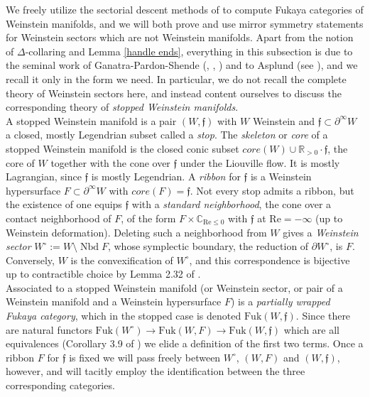 \documentclass[11pt]{amsart}
\theoremstyle{definition}
\theoremstyle{remark}
\newcommand{\Fuk}{\mathrm{Fuk}}
\numberwithin{equation}{section}
\begin{document}
We freely utilize the sectorial descent methods of \cite{GPSI} to compute Fukaya categories of Weinstein manifolds, and we will both prove and use mirror symmetry statements for Weinstein sectors which are not Weinstein manifolds. Apart from the notion of $\Delta$-collaring and Lemma \ref{handle ends}, everything in this subsection is due to the seminal work of Ganatra-Pardon-Shende (\cite{GPS1}, \cite{GPSI}, \cite{GPSIII}) and to Asplund (see \cite{Asplund}), and we recall it only in the form we need. In particular, we do not recall the complete theory of Weinstein sectors here, and instead content ourselves to discuss the corresponding theory of \textit{stopped Weinstein manifolds}.\\

A stopped Weinstein manifold is a pair $(W,\mathfrak f)$ with $W$ Weinstein and $\mathfrak f\subset\partial^\infty W$ a closed, mostly Legendrian subset called a \textit{stop}. The \textit{skeleton} or \textit{core} of a stopped Weinstein manifold is the closed conic subset $core(W)\cup\mathbb R_{>0}\cdot\mathfrak f$, the core of $W$ together with the cone over $\mathfrak f$ under the Liouville flow. It is mostly Lagrangian, since $\mathfrak f$ is mostly Legendrian. A \textit{ribbon} for $\mathfrak f$ is a Weinstein hypersurface $F\subset\partial^\infty W$ with $core(F)=\mathfrak f$. Not every stop admits a ribbon, but the existence of one equips $\mathfrak f$ with a \textit{standard neighborhood}, the cone over a contact neighborhood of $F$, of the form $F \times\mathbb C_{\mathrm{Re}\le0}$ with $\mathfrak f$ at $\mathrm{Re}= -\infty$ (up to Weinstein deformation). Deleting such a neighborhood from $W$ gives a \textit{Weinstein sector} $W^\circ:= W \setminus \operatorname{Nbd}F$, whose symplectic boundary, the reduction of $\partial W^\circ$, is $F$. Conversely, $W$ is the convexification of $W^\circ$, and this correspondence is bijective up to contractible choice by Lemma 2.32 of \cite{GPS1}.\\

Associated to a stopped Weinstein manifold (or Weinstein sector, or pair of a Weinstein manifold and a Weinstein hypersurface $F$) is a \textit{partially wrapped Fukaya category}, which in the stopped case is denoted $\Fuk(W,\mathfrak f)$. Since there are natural functors $\Fuk(W^\circ) \to \Fuk(W,F) \to \Fuk(W,\mathfrak f)$ which are all equivalences (Corollary 3.9 of \cite{GPSI}) we elide a definition of the first two terms. Once a ribbon $F$ for $\mathfrak{f}$ is fixed we will pass freely between $W^\circ$, $(W,F)$ and $(W,\mathfrak f)$, however, and will tacitly employ the identification between the three corresponding categories.\\
\end{document}
